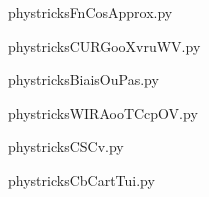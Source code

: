     \newcommand{\CaptionFigFnCosApprox}{<+Type your caption here+>}
    \begin{center}
        
    \end{center}
    phystricksFnCosApprox.py

    

    \clearpage
    


    \newcommand{\CaptionFigCURGooXvruWV}{<+Type your caption here+>}
    \begin{center}
        
    \end{center}
    phystricksCURGooXvruWV.py

    

    \clearpage
    


    \newcommand{\CaptionFigBiaisOuPas}{<+Type your caption here+>}
    \begin{center}
        
    \end{center}
    phystricksBiaisOuPas.py

    

    \clearpage
    


    \newcommand{\CaptionFigWIRAooTCcpOV}{<+Type your caption here+>}
    \begin{center}
        
    \end{center}
    phystricksWIRAooTCcpOV.py

    

    \clearpage
    


    \newcommand{\CaptionFigCSCv}{<+Type your caption here+>}
    \begin{center}
        
    \end{center}
    phystricksCSCv.py

    

    \clearpage
    


    \newcommand{\CaptionFigCbCartTui}{<+Type your caption here+>}
    \begin{center}
        
    \end{center}
    phystricksCbCartTui.py

